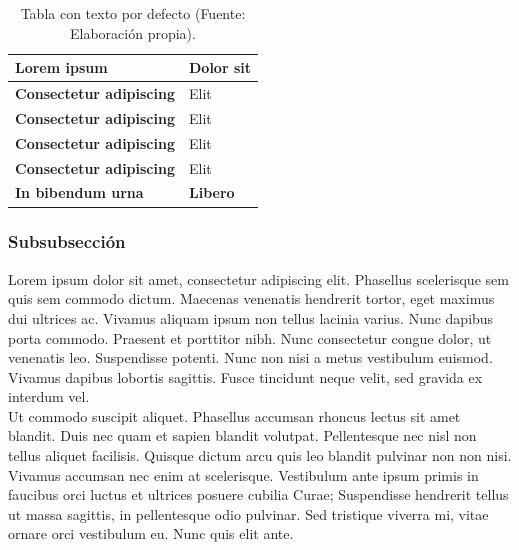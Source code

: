 \renewcommand{\arraystretch}{1.6}
\begin{table}[]
\begin{center}
\begin{tabular}{|m{7cm}| m{7cm} |}
\hline
\rowcolor{Cyan}
\centering \textbf{Lorem ipsum} & \hspace{2.75cm} \textbf{Dolor sit} \\\hline
\textbf{Consectetur adipiscing} & Elit\\ \hline
\rowcolor{GrisTabla}
\textbf{Consectetur adipiscing} & Elit \\ \hline
\textbf{Consectetur adipiscing} & Elit \\ \hline
\rowcolor{GrisTabla} 
\textbf{Consectetur adipiscing} & Elit \\ \hline
\rowcolor{Naranja} 
\textbf{In bibendum urna} & \textbf{Libero} \\ \hline
\end{tabular}
\caption{Tabla con texto por defecto (Fuente: Elaboración propia).}
\label{Medioambiente}
\end{center}
\end{table}

\subsubsection{Subsubsección}

Lorem ipsum dolor sit amet, consectetur adipiscing elit. Phasellus scelerisque sem quis sem commodo dictum. Maecenas venenatis hendrerit tortor, eget maximus dui ultrices ac. Vivamus aliquam ipsum non tellus lacinia varius. Nunc dapibus porta commodo. Praesent et porttitor nibh. Nunc consectetur congue dolor, ut venenatis leo. Suspendisse potenti. Nunc non nisi a metus vestibulum euismod. Vivamus dapibus lobortis sagittis. Fusce tincidunt neque velit, sed gravida ex interdum vel.\\

Ut commodo suscipit aliquet. Phasellus accumsan rhoncus lectus sit amet blandit. Duis nec quam et sapien blandit volutpat. Pellentesque nec nisl non tellus aliquet facilisis. Quisque dictum arcu quis leo blandit pulvinar non non nisi. Vivamus accumsan nec enim at scelerisque. Vestibulum ante ipsum primis in faucibus orci luctus et ultrices posuere cubilia Curae; Suspendisse hendrerit tellus ut massa sagittis, in pellentesque odio pulvinar. Sed tristique viverra mi, vitae ornare orci vestibulum eu. Nunc quis elit ante.\\
\newpage
\thispagestyle{empty}